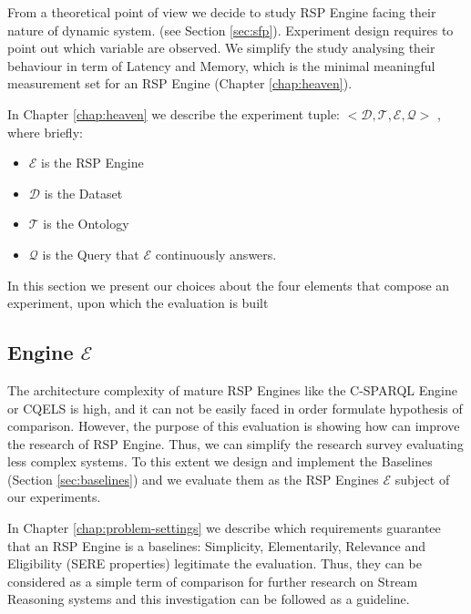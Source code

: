 From a theoretical point of view we decide to study RSP Engine facing their nature of dynamic system. (see Section \ref{sec:sfp}). Experiment design requires to point out which variable are observed. We simplify the study analysing their behaviour in term of Latency and Memory, which is the minimal meaningful measurement set for an RSP Engine (Chapter \ref{chap:heaven}).

In Chapter \ref{chap:heaven} we describe the experiment tuple: $<\mathcal{D}, \mathcal{T},\mathcal{E}, \mathcal{Q}>$ , where briefly:
\begin{itemize}
\item $\mathcal{E}$ is the RSP Engine
\item $\mathcal{D}$ is the Dataset 
\item $\mathcal{T}$ is the Ontology
\item $\mathcal{Q}$ is the Query that $\mathcal{E}$ continuously answers.
\end{itemize}

In this section we present our choices about the four elements that compose an experiment, upon which the evaluation is built

\subsection{Engine $\mathcal{E}$}

The architecture complexity of mature RSP Engines like the C-SPARQL Engine or CQELS is high, and it can not be easily faced in order formulate hypothesis of comparison. However, the purpose of this evaluation is showing how \name can improve the research of RSP Engine. Thus, we can simplify the research survey evaluating less complex systems. To this extent we design and implement the Baselines (Section \ref{sec:baselines}) and we evaluate them as the RSP Engines $\mathcal{E}$ subject of our experiments. 

In Chapter \ref{chap:problem-settings} we describe which requirements guarantee that an RSP Engine is a baselines: Simplicity, Elementarily, Relevance and Eligibility (SERE properties) legitimate the evaluation. Thus, they can be considered as a simple term of comparison for further research on Stream Reasoning systems and this investigation can be followed as a guideline.
 

